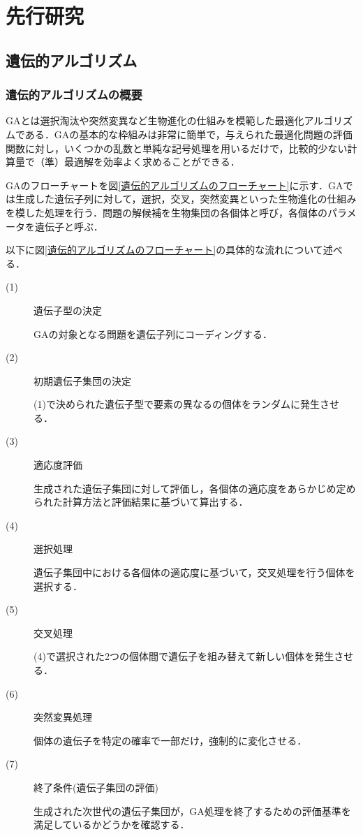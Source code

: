 \chapter{先行研究}
\thispagestyle{fancy} %
\lhead{}
\chead{}
\rhead{}
\lfoot{} 
\cfoot{\thepage}  
\rfoot{}
%

\section{遺伝的アルゴリズム}
\label{sec2.1}

\subsection{遺伝的アルゴリズムの概要}
\label{sec2.1.1}

GAとは選択淘汰や突然変異など生物進化の仕組みを模範した最適化アルゴリズムである\cite{GA}．GAの基本的な枠組みは非常に簡単で，与えられた最適化問題の評価関数に対し，いくつかの乱数と単純な記号処理を用いるだけで，比較的少ない計算量で（準）最適解を効率よく求めることができる\cite{GA}．

GAのフローチャートを図\ref{遺伝的アルゴリズムのフローチャート}に示す．GAでは生成した遺伝子列に対して，選択，交叉，突然変異といった生物進化の仕組みを模した処理を行う．問題の解候補を生物集団の各個体と呼び，各個体のパラメータを遺伝子と呼ぶ．

以下に図\ref{遺伝的アルゴリズムのフローチャート}の具体的な流れについて述べる．


\begin{description}
\item[ (1) ]遺伝子型の決定

GAの対象となる問題を遺伝子列にコーディングする．

\item[ (2) ]初期遺伝子集団の決定

(1)で決められた遺伝子型で要素の異なるの個体をランダムに発生させる．

\item[ (3) ]適応度評価

生成された遺伝子集団に対して評価し，各個体の適応度をあらかじめ定められた計算方法と評価結果に基づいて算出する．

\item[ (4) ]選択処理

遺伝子集団中における各個体の適応度に基づいて，交叉処理を行う個体を選択する．

\item[ (5) ]交叉処理

(4)で選択された2つの個体間で遺伝子を組み替えて新しい個体を発生させる．

\item[ (6) ]突然変異処理

個体の遺伝子を特定の確率で一部だけ，強制的に変化させる．

\item[ (7) ]終了条件(遺伝子集団の評価)

生成された次世代の遺伝子集団が，GA処理を終了するための評価基準を満足しているかどうかを確認する．
\end{description}

